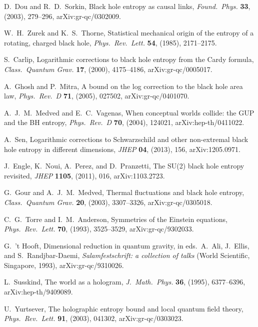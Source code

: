 \documentclass[11pt]{article}
\begin{document}
\begin{thebibliography}{999}
 D.\ Dou and R.~D.\ Sorkin, Black hole entropy as 
causal links, \emph{Found.\ Phys.} {\bf 33}, (2003), 279--296,
arXiv:gr-qc/0302009.

 W.\ H.\ Zurek and K.\ S.\ Thorne, Statistical 
mechanical origin of the entropy of a rotating, charged black 
hole, \emph{Phys.\ Rev.\ Lett.} {\bf 54}, (1985), 2171--2175.

 S.\ Carlip, Logarithmic corrections to black hole entropy 
from the Cardy formula, \emph{Class.\ Quantum Grav.} {\bf 17}, (2000), 
4175--4186, arXiv:gr-qc/0005017.

 A.\ Ghosh and P.\ Mitra, A bound on the log correction to 
the black hole area law, \emph{Phys.\ Rev.\ D} {\bf 71}, (2005), 027502,
arXiv:gr-qc/0401070.

 A.~J.~M.\ Medved and E.~C.\ Vagenas, When conceptual 
worlds collide: the GUP and the BH entropy, \emph{Phys.\ Rev.\ D} {\bf 70}, 
(2004), 124021, arXiv:hep-th/0411022.

 A.\ Sen, Logarithmic corrections to Schwarzschild and other 
non-extremal black hole entropy in different dimensions, \emph{JHEP}
{\bf 04}, (2013), 156, arXiv:1205.0971.

 J.\ Engle, K.\ Noui, A.\ Perez, and D.\ Pranzetti,
The SU(2) black hole entropy revisited, \emph{JHEP} {\bf  1105}, (2011),
016, arXiv:1103.2723.

 G.\ Gour and  A.~J.~M.\ Medved, Thermal fluctuations 
and black hole entropy, \emph{Class.\ Quantum Grav.} {\bf 20}, (2003), 
3307--3326, arXiv:gr-qc/0305018.

 C.~G.\ Torre and I.~M.\ Anderson, Symmetries of 
the Einstein equations, \emph{Phys.\ Rev.\ Lett.} {\bf 70}, (1993), 
3525--3529, arXiv:gr-qc/9302033.

  G.\ 't Hooft, Dimensional reduction in 
quantum gravity, in eds.\  A.\ Ali, J.\ Ellis, and S.\ Randjbar-Daemi,
\emph{Salamfestschrift: a collection of talks}  (World Scientific, 
Singapore, 1993), arXiv:gr-qc/9310026.

 L.\ Susskind, The world as a hologram,
\emph{J.\ Math.\ Phys.} {\bf 36}, (1995), 6377--6396,
arXiv:hep-th/9409089.

 U.\ Yurtsever, The holographic entropy 
bound and local quantum field theory, \emph{Phys.\ Rev.\ Lett.} 
{\bf 91}, (2003), 041302, arXiv:gr-qc/0303023.


\end{thebibliography}
\end{document}

